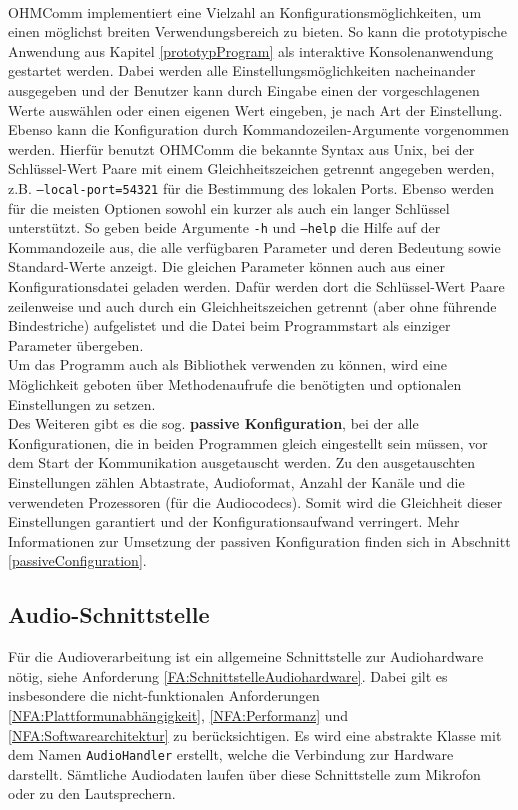 \\%
OHMComm implementiert eine Vielzahl an Konfigurationsmöglichkeiten, um einen möglichst breiten Verwendungsbereich zu bieten. So kann die prototypische Anwendung aus Kapitel \ref{prototypProgram} als interaktive Konsolenanwendung gestartet werden. Dabei werden alle Einstellungsmöglichkeiten nacheinander ausgegeben und der Benutzer kann durch Eingabe einen der vorgeschlagenen Werte auswählen oder einen eigenen Wert eingeben, je nach Art der Einstellung.
\\
Ebenso kann die Konfiguration durch Kommandozeilen-Argumente vorgenommen werden. Hierfür benutzt OHMComm die bekannte Syntax aus Unix, bei der Schlüssel-Wert Paare mit einem Gleichheitszeichen getrennt angegeben werden, z.B. \texttt{--local-port=54321} für die Bestimmung des lokalen Ports. Ebenso werden für die meisten Optionen sowohl ein kurzer als auch ein langer Schlüssel unterstützt. So geben beide Argumente \texttt{-h} und \texttt{--help} die Hilfe auf der Kommandozeile aus, die alle verfügbaren Parameter und deren Bedeutung sowie Standard-Werte anzeigt. Die gleichen Parameter können auch aus einer Konfigurationsdatei geladen werden. Dafür werden dort die Schlüssel-Wert Paare zeilenweise und auch durch ein Gleichheitszeichen getrennt (aber ohne führende Bindestriche) aufgelistet und die Datei beim Programmstart als einziger Parameter übergeben.
\\
Um das Programm auch als Bibliothek verwenden zu können, wird eine Möglichkeit geboten über Methodenaufrufe die benötigten und optionalen Einstellungen zu setzen. %
\\
Des Weiteren gibt es die sog. \textbf{passive Konfiguration}, bei der alle Konfigurationen, die in beiden Programmen gleich eingestellt sein müssen, vor dem Start der Kommunikation ausgetauscht werden. Zu den ausgetauschten Einstellungen zählen Abtastrate, Audioformat, Anzahl der Kanäle und die verwendeten Prozessoren (für die Audiocodecs). Somit wird die Gleichheit dieser Einstellungen garantiert und der Konfigurationsaufwand verringert. Mehr Informationen zur Umsetzung der passiven Konfiguration finden sich in Abschnitt \ref{passiveConfiguration}.

\subsection{Audio-Schnittstelle}
Für die Audioverarbeitung ist ein allgemeine Schnittstelle zur Audiohardware nötig, siehe Anforderung \ref{FA:SchnittstelleAudiohardware}. Dabei gilt es insbesondere die nicht-funktionalen Anforderungen \ref{NFA:Plattformunabhängigkeit}, \ref{NFA:Performanz} und \ref{NFA:Softwarearchitektur} zu berücksichtigen. Es wird eine abstrakte Klasse mit dem Namen \texttt{AudioHandler} erstellt, welche die Verbindung zur Hardware darstellt. Sämtliche Audiodaten laufen über diese Schnittstelle zum Mikrofon oder zu den Lautsprechern. 

